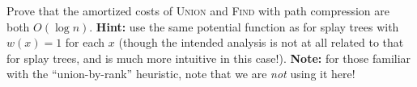 \documentclass[12pt]{article}
\begin{document}
\begin{center}
\end{center}

Prove that the amortized costs of \textsc{Union} and \textsc{Find} with path compression are both $O(\log n)$. \textbf{Hint:} use the same potential function as for splay trees with $w(x) = 1$ for each $x$ (though the intended analysis is not at all related to that for splay trees, and is much more intuitive in this case!). \textbf{Note:} for those familiar with the ``union-by-rank'' heuristic, note that we are {\em not} using it here!
\end{document}
